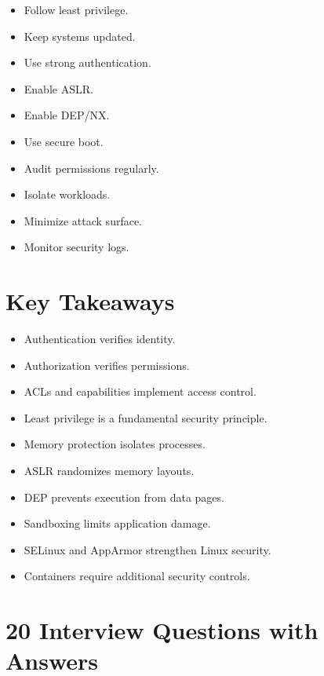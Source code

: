 \begin{itemize}
\item Follow least privilege.
\item Keep systems updated.
\item Use strong authentication.
\item Enable ASLR.
\item Enable DEP/NX.
\item Use secure boot.
\item Audit permissions regularly.
\item Isolate workloads.
\item Minimize attack surface.
\item Monitor security logs.
\end{itemize}

\section{Key Takeaways}

\begin{itemize}
\item Authentication verifies identity.
\item Authorization verifies permissions.
\item ACLs and capabilities implement access control.
\item Least privilege is a fundamental security principle.
\item Memory protection isolates processes.
\item ASLR randomizes memory layouts.
\item DEP prevents execution from data pages.
\item Sandboxing limits application damage.
\item SELinux and AppArmor strengthen Linux security.
\item Containers require additional security controls.
\end{itemize}

\section{20 Interview Questions with Answers}

